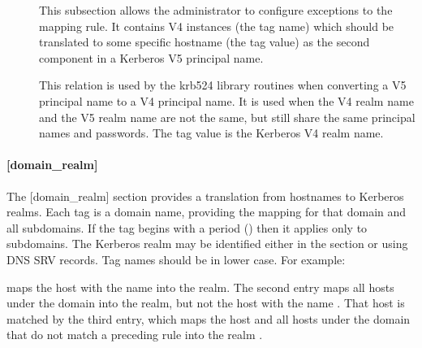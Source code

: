 \documentclass[letterpaper,10pt,english]{sphinxmanual}
\begin{document}
\begin{description}
\item[{}] \leavevmode
This subsection allows the administrator to configure exceptions
to the  mapping rule.  It contains V4 instances
(the tag name) which should be translated to some specific
hostname (the tag value) as the second component in a Kerberos V5
principal name.

\item[{}] \leavevmode
This relation is used by the krb524 library routines when
converting a V5 principal name to a V4 principal name.  It is used
when the V4 realm name and the V5 realm name are not the same, but
still share the same principal names and passwords. The tag value
is the Kerberos V4 realm name.

\end{description}


\paragraph{{[}domain\_realm{]}}
\label{\detokenize{admin/conf_files/krb5_conf:id3}}\label{\detokenize{admin/conf_files/krb5_conf:domain-realm}}
The {[}domain\_realm{]} section provides a translation from hostnames to
Kerberos realms.  Each tag is a domain name, providing the mapping for
that domain and all subdomains.  If the tag begins with a period
() then it applies only to subdomains.  The Kerberos realm may be
identified either in the {\hyperref[\detokenize{admin/conf_files/krb5_conf:realms}]{}} section or using DNS SRV records.
Tag names should be in lower case.  For example:

%
\begin{sphinxVerbatim}[commandchars=\\\{\}]
\PYG{p}{[}\PYG{p}{]}
      
      
      
\end{sphinxVerbatim}

maps the host with the name  into the
 realm.  The second entry maps all hosts under the
domain  into the  realm, but not
the host with the name .  That host is matched
by the third entry, which maps the host  and all hosts
under the domain  that do not match a preceding rule
into the realm .
\end{document}
